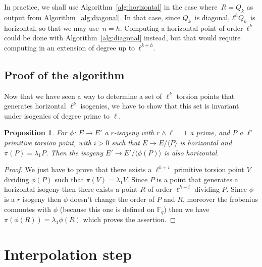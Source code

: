 \documentclass{lms}
\newtheorem{prop}[thm]{Proposition}
\begin{document}
In practice, we shall use Algorithm~\ref{alg:horizontal}
in the case where~$R = Q_{k}$ as output from Algorithm~\ref{alg:diagonal}.
In that case, since $Q_k$~is diagonal, $ℓ^{h} Q_k$~is horizontal,
so that we may use~$n=h$.
Computing a horizontal point of order~$ℓ^k$ could be done
with Algorithm~\ref{alg:diagonal} instead,
but that would require computing in an extension
of degree up to~$ℓ^{k+h}$.


\subsection{Proof of the algorithm}
Now that we have seen a way to determine a set of $\ell^{k}$ torsion points that generates horizontal $\ell^k$ isogenies, we have to show that this set is invariant under isogenies of degree prime to $\ell$.

\begin{prop}
For $\phi$: $E \rightarrow E'$ a $r$-isogeny  with $r \wedge \ell=1$ a prime, and $P$ a $\ell^i$ primitive torsion point, with $i>0$ such that $E \rightarrow E / \langle P \rangle $ is horizontal and $\pi(P)=\lambda_1P$. Then the isogeny  $E' \rightarrow E' / \langle \phi(P) \rangle$ is also horizontal.
\end{prop}

\begin{proof}
We just have to prove that there exists a $\ell^{h+i}$ primitive torsion point $V$ dividing $\phi(P)$ such that $\pi(V)=\lambda_1V$.
Since $P$ is a point that generates a horizontal isogeny then there exists a point $R$ of order $\ell^{h+i}$ dividing $P$. Since $\phi$ is a $r$ isogeny then $\phi$ doesn't change the order of $P$ and $R$, moreover the frobenius commutes with $\phi$ (because this one is defined on $\mathbb{F}_q$) then we have $\pi(\phi(R))=\lambda_1\phi(R)$ which proves the assertion.
\end{proof}




\section{Interpolation step}
\label{sec:interpolation}
\end{document}
